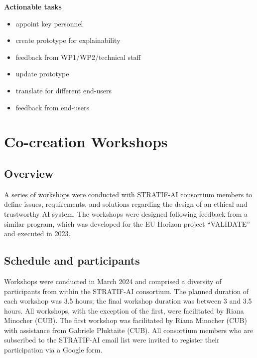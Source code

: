 \documentclass[
  letterpaper,
  DIV=11,
  numbers=noendperiod]{scrreport}
\providecommand{\tightlist}{%
  \setlength{\itemsep}{0pt}\setlength{\parskip}{0pt}}\usepackage{longtable,booktabs,array}
\begin{document}
\textbf{Actionable tasks}

\begin{itemize}
\tightlist
\item
  appoint key personnel
\item
  create prototype for explainability
\item
  feedback from WP1/WP2/technical staff
\item
  update prototype
\item
  translate for different end-users
\item
  feedback from end-users
\end{itemize}


\hypertarget{co-creation-workshops}{%
\chapter*{Co-creation Workshops}\label{co-creation-workshops}}


\hypertarget{overview-2}{%
\section*{Overview}\label{overview-2}}


A series of workshops were conducted with STRATIF-AI consortium members
to define issues, requirements, and solutions regarding the design of an
ethical and trustworthy AI system. The workshops were designed following
feedback from a similar program, which was developed for the EU Horizon
project ``VALIDATE'' and executed in 2023.

\hypertarget{schedule-and-participants}{%
\section*{Schedule and participants}\label{schedule-and-participants}}


Workshops were conducted in March 2024 and comprised a diversity of
participants from within the STRATIF-AI consortium. The planned duration
of each workshop was 3.5 hours; the final workshop duration was between
3 and 3.5 hours. All workshops, with the exception of the first, were
facilitated by Riana Minocher (CUB). The first workshop was facilitated
by Riana Minocher (CUB) with assistance from Gabriele Pluktaite (CUB).
All consortium members who are subscribed to the STRATIF-AI email list
were invited to register their participation via a Google form.
\end{document}
